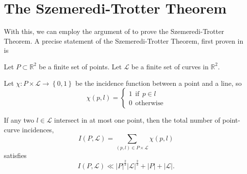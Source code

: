 \documentclass[12pt,reqno]{amsart}
\begin{document}
\section{The Szemeredi-Trotter Theorem}

With this, we can employ the argument of \cite{szekely-SzT} to prove the Szemeredi-Trotter Theorem.
A precise statement of the Szemeredi-Trotter Theorem, first proven in \cite{SzT-original} is

\begin{theorem}
Let \(P \subset \mathbb{R} ^{2}\) be a finite set of points. Let \(\mathcal{L} \) be a finite set of curves in \(\mathbb{R} ^{2}\). 

Let \(\chi : P \times \mathcal{L}  \to \left\{ 0,1 \right\} \) be the incidence function
between a point and a line, so
\[
\chi(p,l) = 
\begin{cases}
1 ~ ~ \text{if} ~ ~ p\in l\\
0 ~ ~ \text{otherwise} 
\end{cases}
\]

If any two \( l \in \mathcal{L} \) intersect in at most one point,
then the total number of point-curve incidences,
\[
    I(P, \mathcal{L} ) = \sum _{(p,l)\in P \times \mathcal{L} } \chi(p,l)
\]
satisfies
\[
    I(P,\mathcal{L} ) \ll  \left\lvert P \right\rvert^{\frac{2}{3} } \left\lvert \mathcal{L}  \right\rvert ^{\frac{2}{3} } + \left\lvert P \right\rvert + \left\lvert \mathcal{L}  \right\rvert 
.\]
\end{theorem}
\end{document}
